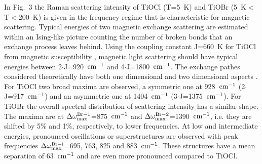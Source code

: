 \documentclass[prb,preprint,draft,amsmath,showpacs]{revtex4}
\begin{document}
In Fig.~3  the Raman scattering intensity of TiOCl (T=5~K) and TiOBr
(5~K$<$T$<$200~K) is given in the frequency regime that is characteristic for magnetic
scattering. Typical energies of two magnetic exchange scattering are estimated within an
Ising-like picture counting the number of broken bonds that an exchange process leaves
behind. Using the coupling constant J=660~K for TiOCl from magnetic susceptibility
\cite{seidel03},  magnetic light scattering should have typical energies between
2$\cdot$J=920~$\rm cm^{-1}$ and 4$\cdot$J=1800~$\rm cm^{-1}$. The exchange pathes
considered theoretically have both one dimensional and two dimensional aspects
\cite{valenti03}. For TiOCl two broad maxima are observed, a symmetric one at 928~$\rm
cm^{-1}$ (2$\cdot$J=917~$\rm cm^{-1}$) and an asymmetric one at 1404~$\rm cm^{-1}$
(3$\cdot$J=1375~$\rm cm^{-1}$). For TiOBr the overall spectral distribution of
scattering intensity has a similar shape. The maxima are at $\rm
\Delta\omega_{max}^{Br-1}$=875~$\rm cm^{-1}$ and $\rm
\Delta\omega_{max}^{Br-2}$=1390~$\rm cm^{-1}$, i.e. they are shifted by 5\% and 1\%,
respectively, to lower frequencies. At low and intermediate energies,  pronounced
oscillations or superstructures are observed with peak frequencies $\rm
\Delta\omega_{max}^{Br-i}$=695, 763, 825 and 883~$\rm cm^{-1}$. These structures have a
mean separation of 63~$\rm cm^{-1}$ and are even more pronounced compared to TiOCl.


\end{document}
